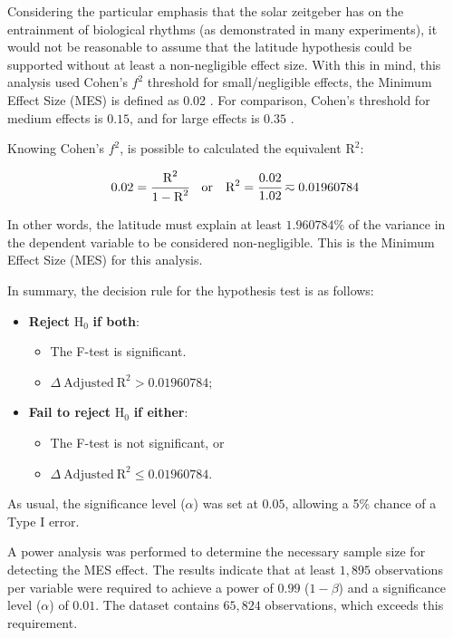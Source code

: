 \documentclass[
12pt,
openright,
oneside,
a4paper,
chapter=TITLE,
section=TITLE,
french,
spanish,
brazil,
english
]{abntex2}\usepackage{array}
\begin{document}
Considering the particular emphasis that the solar zeitgeber has on the
entrainment of biological rhythms (as demonstrated in many experiments),
it would not be reasonable to assume that the latitude hypothesis could
be supported without at least a non-negligible effect size. With this in
mind, this analysis used Cohen's \(f^{2}\) threshold for
small/negligible effects, the Minimum Effect Size (MES) is defined as
0.02 \autocites[413]{cohen1988}[157]{cohen1992}. For comparison, Cohen's
threshold for medium effects is \(0.15\), and for large effects is
\(0.35\) \autocites[413-414]{cohen1988}[157]{cohen1992}.

Knowing Cohen's \(f^2\), is possible to calculated the equivalent
\(\text{R}^{2}\):

\[
0.02 = \cfrac{\text{R}^{2}}{1 - \text{R}^{2}} \quad \text{or} \quad \text{R}^{2} = \cfrac{0.02}{1.02} \eqsim 0.01960784
\]

In other words, the latitude must explain at least \(1.960784\%\) of the
variance in the dependent variable to be considered non-negligible. This
is the Minimum Effect Size (MES) for this analysis.

In summary, the decision rule for the hypothesis test is as follows:

\begin{itemize}
\tightlist
\item
  \textbf{Reject} \(\text{H}_{0}\) \textbf{if both}:

  \begin{itemize}
  \tightlist
  \item
    The F-test is significant.
  \item
    \(\Delta \ \text{Adjusted} \ \text{R}^{2} > 0.01960784\);
  \end{itemize}
\item
  \textbf{Fail to reject} \(\text{H}_{0}\) \textbf{if either}:

  \begin{itemize}
  \tightlist
  \item
    The F-test is not significant, or
  \item
    \(\Delta \ \text{Adjusted} \ \text{R}^{2} \leq 0.01960784\).
  \end{itemize}
\end{itemize}

As usual, the significance level (\(\alpha\)) was set at \(0.05\),
allowing a 5\% chance of a Type I error.

A power analysis was performed to determine the necessary sample size
for detecting the MES effect. The results indicate that at least
\(1,895\) observations per variable were required to achieve a power of
\(0.99\) (\(1 - \beta\)) and a significance level (\(\alpha\)) of
\(0.01\). The dataset contains \(65,824\) observations, which exceeds
this requirement.
\end{document}
